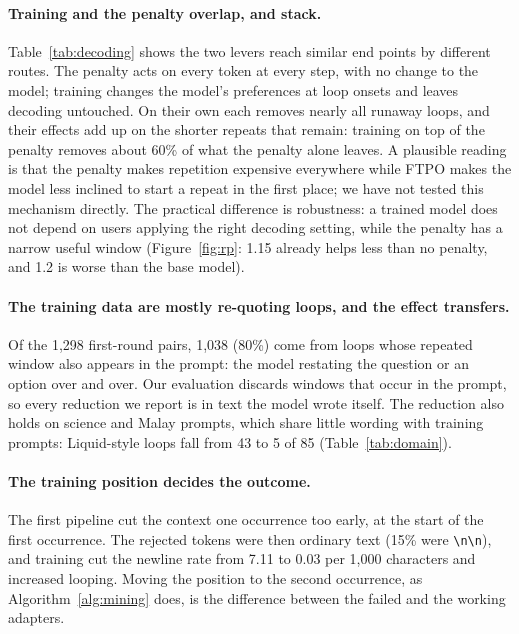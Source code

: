 \documentclass[11pt]{article}
\begin{document}
\paragraph{Training and the penalty overlap, and stack.} Table~\ref{tab:decoding} shows the two levers reach similar end points by different routes. The penalty acts on every token at every step, with no change to the model; training changes the model's preferences at loop onsets and leaves decoding untouched. On their own each removes nearly all runaway loops, and their effects add up on the shorter repeats that remain: training on top of the penalty removes about 60\% of what the penalty alone leaves. A plausible reading is that the penalty makes repetition expensive everywhere while FTPO makes the model less inclined to start a repeat in the first place; we have not tested this mechanism directly. The practical difference is robustness: a trained model does not depend on users applying the right decoding setting, while the penalty has a narrow useful window (Figure~\ref{fig:rp}: 1.15 already helps less than no penalty, and 1.2 is worse than the base model).

\paragraph{The training data are mostly re-quoting loops, and the effect transfers.} Of the 1,298 first-round pairs, 1,038 (80\%) come from loops whose repeated window also appears in the prompt: the model restating the question or an option over and over. Our evaluation discards windows that occur in the prompt, so every reduction we report is in text the model wrote itself. The reduction also holds on science and Malay prompts, which share little wording with training prompts: Liquid-style loops fall from 43 to 5 of 85 (Table~\ref{tab:domain}).

\paragraph{The training position decides the outcome.} The first pipeline cut the context one occurrence too early, at the start of the first occurrence. The rejected tokens were then ordinary text (15\% were \verb|\n\n|), and training cut the newline rate from 7.11 to 0.03 per 1,000 characters and increased looping. Moving the position to the second occurrence, as Algorithm~\ref{alg:mining} does, is the difference between the failed and the working adapters.
\end{document}
